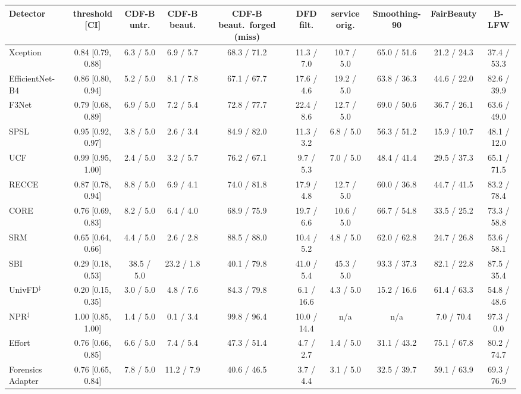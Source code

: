 \begin{tabular}{@{}l c cccccccc@{}}
\toprule
Detector & threshold [CI] & CDF-B untr. & CDF-B beaut. & CDF-B beaut.\ forged (miss) & DFD filt. & service orig. & Smoothing-90 & FairBeauty & B-LFW \\
\midrule
Xception~\cite{xception} & 0.84 [0.79, 0.88] & 6.3 / 5.0 & 6.9 / 5.7 & 68.3 / 71.2 & 11.3 / 7.0 & 10.7 / 5.0 & 65.0 / 51.6 & 21.2 / 24.3 & 37.4 / 53.3 \\
EfficientNet-B4~\cite{efficientnet} & 0.86 [0.80, 0.94] & 5.2 / 5.0 & 8.1 / 7.8 & 67.1 / 67.7 & 17.6 / 4.6 & 19.2 / 5.0 & 63.8 / 36.3 & 44.6 / 22.0 & 82.6 / 39.9 \\
F3Net~\cite{f3net} & 0.79 [0.68, 0.89] & 6.9 / 5.0 & 7.2 / 5.4 & 72.8 / 77.7 & 22.4 / 8.6 & 12.7 / 5.0 & 69.0 / 50.6 & 36.7 / 26.1 & 63.6 / 49.0 \\
SPSL~\cite{spsl} & 0.95 [0.92, 0.97] & 3.8 / 5.0 & 2.6 / 3.4 & 84.9 / 82.0 & 11.3 / 3.2 & 6.8 / 5.0 & 56.3 / 51.2 & 15.9 / 10.7 & 48.1 / 12.0 \\
UCF~\cite{ucf} & 0.99 [0.95, 1.00] & 2.4 / 5.0 & 3.2 / 5.7 & 76.2 / 67.1 & 9.7 / 5.3 & 7.0 / 5.0 & 48.4 / 41.4 & 29.5 / 37.3 & 65.1 / 71.5 \\
RECCE~\cite{recce} & 0.87 [0.78, 0.94] & 8.8 / 5.0 & 6.9 / 4.1 & 74.0 / 81.8 & 17.9 / 4.8 & 12.7 / 5.0 & 60.0 / 36.8 & 44.7 / 41.5 & 83.2 / 78.4 \\
CORE~\cite{core} & 0.76 [0.69, 0.83] & 8.2 / 5.0 & 6.4 / 4.0 & 68.9 / 75.9 & 19.7 / 6.6 & 10.6 / 5.0 & 66.7 / 54.8 & 33.5 / 25.2 & 73.3 / 58.8 \\
SRM~\cite{srm} & 0.65 [0.64, 0.66] & 4.4 / 5.0 & 2.6 / 2.8 & 88.5 / 88.0 & 10.4 / 5.2 & 4.8 / 5.0 & 62.0 / 62.8 & 24.7 / 26.8 & 53.6 / 58.1 \\
SBI~\cite{sbi} & 0.29 [0.18, 0.53] & 38.5 / 5.0 & 23.2 / 1.8 & 40.1 / 79.8 & 41.0 / 5.4 & 45.3 / 5.0 & 93.3 / 37.3 & 82.1 / 22.8 & 87.5 / 35.4 \\
UnivFD$^\ddagger$~\cite{univfd} & 0.20 [0.15, 0.35] & 3.0 / 5.0 & 4.8 / 7.6 & 84.3 / 79.8 & 6.1 / 16.6 & 4.3 / 5.0 & 15.2 / 16.6 & 61.4 / 63.3 & 54.8 / 48.6 \\
NPR$^\ddagger$~\cite{npr} & 1.00 [0.85, 1.00] & 1.4 / 5.0 & 0.1 / 3.4 & 99.8 / 96.4 & 10.0 / 14.4 & n/a & n/a & 7.0 / 70.4 & 97.3 / 0.0 \\
Effort~\cite{effort} & 0.76 [0.66, 0.85] & 6.6 / 5.0 & 7.4 / 5.4 & 47.3 / 51.4 & 4.7 / 2.7 & 1.4 / 5.0 & 31.1 / 43.2 & 75.1 / 67.8 & 80.2 / 74.7 \\
Forensics Adapter~\cite{forensicsadapter} & 0.76 [0.65, 0.84] & 7.8 / 5.0 & 11.2 / 7.9 & 40.6 / 46.5 & 3.7 / 4.4 & 3.1 / 5.0 & 32.5 / 39.7 & 59.1 / 63.9 & 69.3 / 76.9 \\

\end{tabular}
